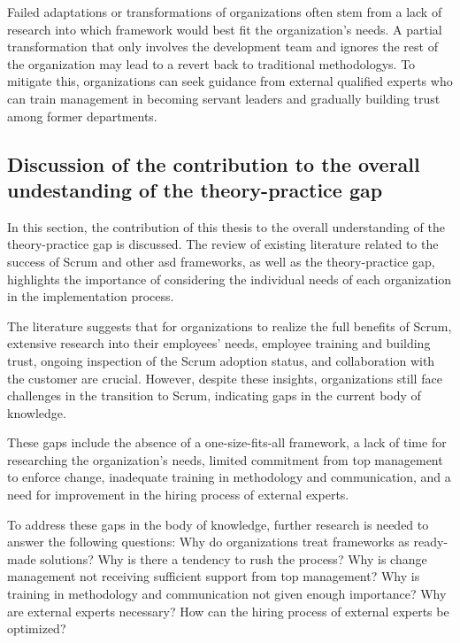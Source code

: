 Failed \glspl{adaptation} or \glspl{transformation} of organizations often stem from a lack of research into which \gls{framework} would best fit the organization's needs. A partial \gls{transformation} that only involves the development team and ignores the rest of the organization may lead to a revert back to traditional \glspl{methodology}. To mitigate this, organizations can seek guidance from external qualified experts who can train management in becoming servant leaders and gradually building trust among former departments.

\subsection*{Discussion of the contribution to the overall undestanding of the theory-practice gap}\label{subsec:DiscussionTheoryPracticeGap}
In this section, the contribution of this thesis to the overall understanding of the theory-practice gap is discussed. The review of existing literature related to the success of Scrum and other \ac{asd} \glspl{framework}, as well as the theory-practice gap, highlights the importance of considering the individual needs of each organization in the implementation process.

The literature suggests that for organizations to realize the full benefits of Scrum, extensive research into their employees' needs, employee training and building trust, ongoing inspection of the Scrum \gls{adoption} status, and collaboration with the \gls{customer} are crucial. However, despite these insights, organizations still face challenges in the \gls{transition} to Scrum, indicating gaps in the current body of knowledge.


These gaps include the absence of a one-size-fits-all \gls{framework}, a lack of time for researching the organization's needs, limited \gls{commitment} from top management to enforce change, inadequate training in \gls{methodology} and communication, and a need for improvement in the hiring process of external experts.

\newpage

To address these gaps in the body of knowledge, further research is needed to answer the following questions: Why do organizations treat \glspl{framework} as ready-made solutions? Why is there a tendency to rush the process? Why is change management not receiving sufficient support from top management? Why is training in \gls{methodology} and communication not given enough importance? Why are external experts necessary? How can the hiring process of external experts be optimized?


